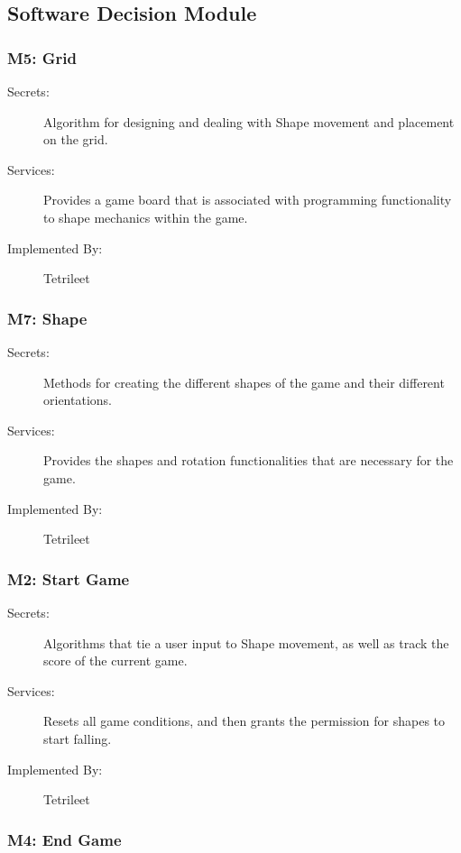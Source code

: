 \documentclass[12pt, titlepage]{article}
\begin{document}
\subsection{Software Decision Module}

\subsubsection{M5: Grid}
\begin{description}
\item[Secrets:] Algorithm for designing and dealing with Shape movement and placement on the grid.
\item[Services:] Provides a game board that is associated with programming functionality to shape mechanics within the game.
\item[Implemented By:] Tetrileet
\end{description}

\subsubsection{M7: Shape}

\begin{description}
\item[Secrets:] Methods for creating the different shapes of the game and their different orientations.
\item[Services:]Provides the shapes and rotation functionalities that are necessary for the game.
\item[Implemented By:] Tetrileet
\end{description}

\subsubsection{M2: Start Game}

\begin{description}
\item[Secrets:] Algorithms that tie a user input to Shape movement, as well as track the score of the current game.
\item[Services:] Resets all game conditions, and then grants the permission for shapes to start falling.
\item[Implemented By:] Tetrileet
\end{description}

\subsubsection{M4: End Game}
\end{document}
